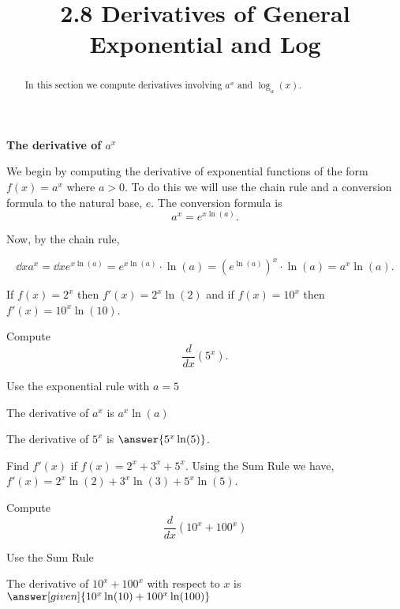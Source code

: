 \documentclass{ximera}
\title{2.8 Derivatives of General Exponential and Log}
\begin{document}
\begin{abstract}
In this section we compute derivatives involving $a^x$ and $\log_a(x)$.
\end{abstract}

\maketitle




\begin{center}
\textbf{The derivative of $a^x$}
\end{center}


We begin by computing the derivative of exponential functions of the form  $f(x) = a^x$ where $a > 0$. 
To do this we will use the chain rule and a conversion formula to the natural base, $e$. 
The conversion formula is 
\[
a^x = e^{x\ln(a)}.
\]

Now, by the chain rule,

\[
\dd{x} a^x = \dd{x} e^{x\ln(a)}  = e^{x\ln(a)}\cdot \ln(a) = \left(e^{\ln(a)}\right)^x\cdot \ln(a) = a^x \ln(a).
\]



\begin{example} %
If $f(x) = 2^x$ then $f'(x) = 2^x \ln(2)$
and if $f(x) = 10^x$ then $f'(x) = 10^x \ln(10)$.
\end{example}



\begin{problem}
Compute
\[
\frac{d}{dx} \left(5^x\right).
\]
\begin{hint}
Use the exponential rule with $a = 5$
\end{hint}
\begin{hint}
The derivative of $a^x$ is $a^x\ln(a)$
\end{hint}
The derivative of $5^x$ is $\answer{5^x\ln(5)}$.
\end{problem}




\begin{example} %
 Find $f'(x)$ if $f(x) = 2^x + 3^x + 5^x.$
Using the Sum Rule we have, $f'(x) = 2^x\ln(2) + 3^x\ln(3) + 5^x\ln(5)$.
\end{example}


\begin{problem} %
  Compute 
  \[
  \frac{d}{dx} \left(10^x + 100^x\right)
  \]
  
    \begin{hint}
      Use the Sum Rule
    \end{hint}    
		The derivative of $10^x + 100^x$ with respect to $x$ is
		 $\answer[given]{10^x \ln(10) + 100^x \ln(100)}$
	
\end{problem}
\end{document}
